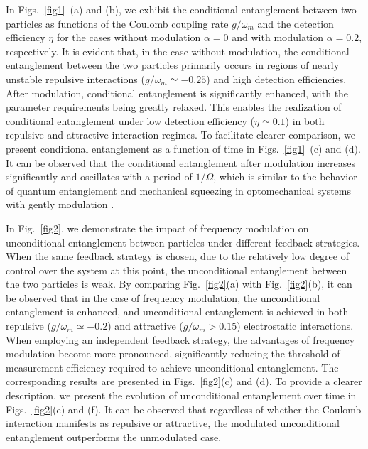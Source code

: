 \documentclass[
aps,
reprint,
superscriptaddress,
amsmath,amssymb,
pra
]{revtex4-2}
\begin{document}
In Figs.~\ref{fig1}~(a) and (b), we exhibit the  conditional entanglement between two particles as functions of the Coulomb coupling rate $g/\omega_m$ and the detection efficiency $\eta$ for the cases without modulation $\alpha=0$ and with modulation $\alpha=0.2$, respectively. It is evident that, in the case without modulation, the conditional entanglement between the two particles primarily occurs in regions of nearly unstable repulsive interactions ($g/\omega_{m}\simeq-0.25$) and high detection efficiencies. After modulation, conditional entanglement is significantly enhanced, with the parameter requirements being greatly relaxed. This enables the realization of conditional entanglement under low detection efficiency ($\eta \simeq 0.1$) in both repulsive and attractive interaction regimes. To facilitate clearer comparison, we present conditional entanglement as a function of time in Figs.~\ref{fig1}~(c) and (d). It can be observed that the conditional entanglement after modulation increases significantly and oscillates with a period of $1/\Omega$, which is similar to the behavior of quantum entanglement and mechanical squeezing in optomechanical systems with gently modulation \cite{PhysRevA.104.053506, mari2012opto}.


In Fig.~\ref{fig2}, we demonstrate the impact of frequency modulation on unconditional entanglement between particles under different feedback strategies. When the same feedback strategy is chosen, due to the relatively low degree of control over the system at this point, the unconditional entanglement between the two particles is weak. By comparing Fig.~\ref{fig2}(a) with Fig.~\ref{fig2}(b), it can be observed that in the case of frequency modulation, the unconditional entanglement is enhanced, and unconditional entanglement is achieved in both repulsive ($g/\omega_m\simeq-0.2$) and attractive ($g/\omega_m>0.15$) electrostatic interactions. When employing an independent feedback strategy, the advantages of frequency modulation become more pronounced, significantly reducing the threshold of measurement efficiency required to achieve unconditional entanglement. The corresponding results are presented in Figs.~\ref{fig2}(c) and (d). To provide a clearer description, we present the evolution of unconditional entanglement over time in Figs.~\ref{fig2}(e) and (f). It can be observed that regardless of whether the Coulomb interaction manifests as repulsive or attractive, the modulated unconditional entanglement outperforms the unmodulated case.
\end{document}
